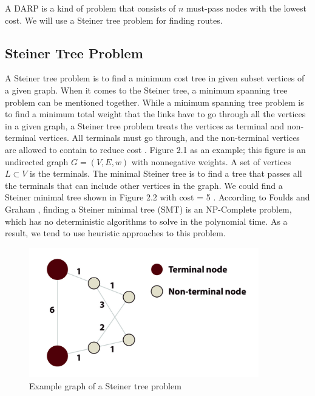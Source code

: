 A DARP is a kind of problem that consists of $n$ must-pass nodes with the lowest cost. We will use a Steiner tree problem for finding routes.

\subsection{Steiner Tree Problem}

A Steiner tree problem is to find a minimum cost tree in given subset vertices of a given graph. When it comes to the Steiner tree, a minimum spanning tree problem can be mentioned together. While a minimum spanning tree problem is to find a minimum total weight that the links have to go through all the vertices in a given graph, a Steiner tree problem treats the vertices as terminal and non-terminal vertices. All terminals must go through, and the non-terminal vertices are allowed to contain to reduce cost \cite{wu_steiner_nodate}. Figure 2.1 as an example; this figure is an undirected graph $G=(V, E, w)$ with nonnegative weights. A set of vertices $L \subset V$ is the terminals. The minimal Steiner tree is to find a tree that passes all the terminals that can include other vertices in the graph. We could find a Steiner minimal tree shown in Figure 2.2 with cost = 5 \cite{wuzhifeng_steiner_nodate}. According to Foulds and Graham \cite{foulds_steiner_1982}, finding a Steiner minimal tree (SMT) is an NP-Complete problem, which has no deterministic algorithms to solve in the polynomial time. As a result, we tend to use heuristic approaches to this problem.

\begin{figure}[htp]
  \centering
  \captionsetup{justification=centering}
  \includegraphics[width=10cm]{figures/steiner_1.jpg}
  \caption{Example graph of a Steiner tree problem}
\end{figure}

